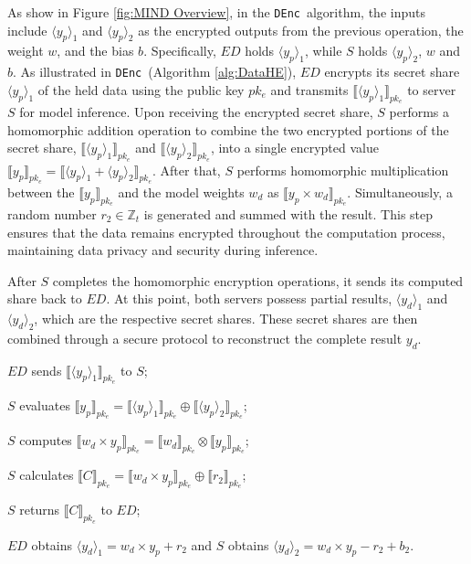 \documentclass[conference]{IEEEtran}
\newcommand{\DEnc}{\texttt{DEnc}}
\begin{document}
As show in Figure \ref{fig:MIND Overview}, in the \DEnc~algorithm, the inputs include $\langle y_p\rangle_1$ and $\langle  y_p\rangle_2$ as the encrypted outputs from the previous operation, the weight $w$, and the bias $b$. Specifically, $ED$ holds $\langle y_p\rangle_1$, while $S$ holds $\langle y_p\rangle_2$, $w$ and $b$. As illustrated in \DEnc~(Algorithm \ref{alg:DataHE}), $ED$ encrypts its secret share $\langle y_p \rangle_1$ of the held data using the public key $pk_e$ and transmits $\llbracket\langle y_p \rangle_1\rrbracket_{pk_e}$ to server $S$ for model inference. Upon receiving the encrypted secret share, $S$ performs a homomorphic addition operation to combine the two encrypted portions of the secret share, $\llbracket\langle y_p \rangle_1\rrbracket_{pk_e}$ and $\llbracket\langle y_p \rangle_2\rrbracket_{pk_e}$, into a single encrypted value $\llbracket y_p \rrbracket_{pk_e}=\llbracket \langle y_p \rangle_1 +  \langle y_p \rangle_2\rrbracket_{pk_e}$. After that, $S$ performs homomorphic multiplication between the $\llbracket y_p \rrbracket_{pk_e}$ and the model weights $w_d$ as $\llbracket y_p\times w_d \rrbracket_{pk_e}$. Simultaneously, a random number $r_2 \in \mathbb{Z}_t$ is generated and summed with the result. This step ensures that the data remains encrypted throughout the computation process, maintaining data privacy and security during inference.
 
After $S$ completes the homomorphic encryption operations, it sends its computed share back to $ED$. At this point, both servers possess partial results, $\langle y_d \rangle_1$ and $\langle y_d \rangle_2$, which are the respective secret shares. These secret shares are then combined through a secure protocol to reconstruct the complete result $y_d$.
\begin{algorithm}[htbp]
	\caption{\DEnc$(\langle y_p \rangle_1,\langle y_p \rangle_2,w,b) \rightarrow (\langle y_d\rangle_1,\langle y_d\rangle_2)$\!\!\!\!\!}
    \label{alg:DataHE}
    \LinesNumbered
    $ED$ sends $\llbracket\langle y_p \rangle_1\rrbracket_{pk_e}$ to $S$;
    
    $S$ evaluates $\llbracket y_p \rrbracket_{pk_e} = \llbracket \langle y_p \rangle_1 \rrbracket_{pk_e}  \oplus  \llbracket\langle y_p\rangle_2\rrbracket_{pk_e}$;
    
    $S$ computes $\llbracket w_d \times y_p \rrbracket_{pk_e} = \llbracket w_d \rrbracket_{pk_e} \otimes \llbracket  y_p \rrbracket_{pk_e}$;
    
    $S$ calculates $\llbracket C \rrbracket_{pk_e} = \llbracket w_d \times y_p \rrbracket_{pk_e} \oplus \llbracket r_2 \rrbracket_{pk_e}$;
    
    $S$ returns $\llbracket C \rrbracket_{pk_e}$ to $ED$;
    
    $ED$ obtains $\langle y_d\rangle_1=w_d \times y_p+r_2$ and $S$ obtains $\langle y_d \rangle_2 = w_d \times y_p-r_2+b_2$.
\end{algorithm}
\end{document}
